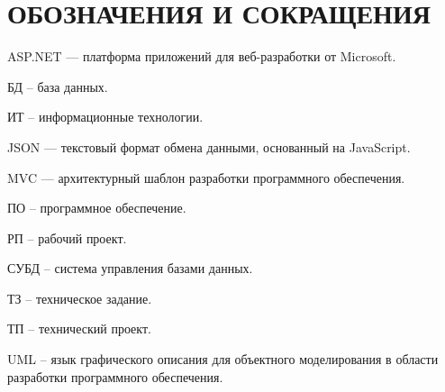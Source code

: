 \section*{ОБОЗНАЧЕНИЯ И СОКРАЩЕНИЯ}

ASP.NET — платформа приложений для веб-разработки от Microsoft.

БД -- база данных.

ИТ -- информационные технологии.

JSON — текстовый формат обмена данными, основанный на JavaScript.

MVC — архитектурный шаблон разработки программного обеспечения.

ПО -- программное обеспечение.

РП -- рабочий проект.

СУБД -- система управления базами данных.

ТЗ -- техническое задание.

ТП -- технический проект.

UML -- язык графического описания для объектного моделирования в области разработки программного обеспечения.
